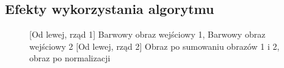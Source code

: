 \documentclass[a4paper,12pt, titlepage]{report}
\begin{document}
\subsection*{Efekty wykorzystania algorytmu}
\begin{figure}[h]
    \centering
    \qquad
    \caption{[Od lewej, rząd 1] Barwowy obraz wejściowy 1, Barwowy obraz wejściowy 2 [Od lewej, rząd 2] Obraz po sumowaniu obrazów 1 i 2, obraz po normalizacji}%
    \label{fig:geo_after_grey1}%
\end{figure}
\end{document}
